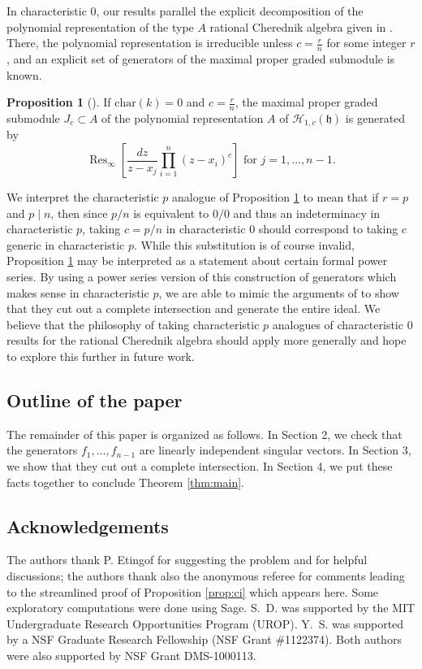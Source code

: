 \documentclass{amsart}
\numberwithin{equation}{section}
\theoremstyle{definition}
\newtheorem{proposition}[theorem]{Proposition}
\newcommand{\Res}{\operatorname{Res}}
\newcommand{\h}{\mathfrak{h}}
\newcommand{\HH}{\mathcal{H}}
\renewcommand{\char}{\text{char}}
\begin{document}
In characteristic $0$, our results parallel the explicit decomposition of the polynomial representation of the type $A$ rational Cherednik algebra given in \cite{BEG, CE}.  There, the polynomial representation is irreducible unless $c = \frac{r}{n}$ for some integer $r$, and an explicit set of generators of the maximal proper graded submodule is known.
\begin{proposition}[{\cite[Proposition 3.1]{CE}}] \label{prop:ce}
If $\char(k) = 0$ and $c = \frac{r}{n}$, the maximal proper graded submodule $J_c \subset A$ of the polynomial representation $A$ of $\HH_{1,c}(\h)$ is generated by
\[
\Res_\infty\left[\frac{dz}{z-x_j} \prod_{i=1}^{n} (z-x_i)^c\right] \text{ for $j=1,\dots,n-1$}.
\]
\end{proposition}
We interpret the characteristic $p$ analogue of Proposition \ref{prop:ce} to mean that if $r = p$ and $p \mid n$, then since $p/n$ is equivalent to $0/0$ and thus an indeterminacy in characteristic $p$, taking $c=p/n$ in characteristic $0$ should correspond to taking $c$ generic in characteristic $p$.  While this substitution is of course invalid, Proposition \ref{prop:ce} may be interpreted as a statement about certain formal power series.  By using a power series version of this construction of generators which makes sense in characteristic $p$, we are able to mimic the arguments of \cite{BEG, CE} to show that they cut out a complete intersection and generate the entire ideal.  We believe that the philosophy of taking characteristic $p$ analogues of characteristic $0$ results for the rational Cherednik algebra should apply more generally and hope to explore this further in future work.

\subsection{Outline of the paper}

The remainder of this paper is organized as follows.  In Section 2, we check that the generators $f_1, \ldots, f_{n - 1}$ are linearly independent singular vectors.  In Section 3, we show that they cut out a complete intersection.  In Section 4, we put these facts together to conclude Theorem \ref{thm:main}.

\subsection{Acknowledgements} 

The authors thank P. Etingof for suggesting the problem and for helpful discussions; the authors thank also the anonymous referee for comments leading to the streamlined proof of Proposition \ref{prop:ci} which appears here.  Some exploratory computations were done using Sage.  S.~D. was supported by the MIT Undergraduate Research Opportunities Program (UROP). Y.~S. was supported by a NSF Graduate Research Fellowship (NSF Grant \#1122374).  Both authors were also supported by NSF Grant DMS-1000113.
\end{document}
